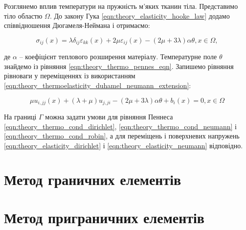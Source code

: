 Розглянемо вплив температури на пружність м'яких тканин тіла. Представимо тіло областю $\Omega$. До закону Гука 
\ref{eqn:theory_elasticity_hooke_law} додамо співвідношення Дюгамеля-Неймана і отримаємо:

\begin{equation}
    \label{eqn:theory_thermoelasticity_duhamel_neumann_extension}
    \sigma_{ij}(x) = \lambda \delta_{ij}\varepsilon_{kk}(x) + 2\mu\varepsilon_{ij}(x) - (2\mu + 3\lambda)\alpha\theta, 
        x \in \Omega,
\end{equation}

\noindent де $\alpha$ -- коефіцієнт теплового розширення матеріалу. Температурне поле $\theta$ знайдемо із рівняння 
\ref{eqn:theory_thermo_pennes_eqn}. Запишемо рівняння рівноваги у переміщеннях із використанням 
\ref{eqn:theory_thermoelasticity_duhamel_neumann_extension}:

\begin{equation}
    \label{eqn:theory_thermoelasticity_displacement_eqn}
    \mu u_{i,jj}(x) + (\lambda + \mu)u_{j,ji} - (2\mu + 3\lambda)\alpha\theta + b_i(x) = 0, x \in \Omega
\end{equation}

На границі $\Gamma$ можна задати умови для рівняння Пеннеса \ref{eqn:theory_thermo_cond_dirichlet}, 
\ref{eqn:theory_thermo_cond_neumann} і \ref{eqn:theory_thermo_cond_robin}, а для переміщень і поверхневих напружень 
\ref{eqn:theory_elasticity_dirichlet} і \ref{eqn:theory_elasticity_neumann} відповідно.

\section{Метод граничних елементів}

\section{Метод приграничних елементів}
